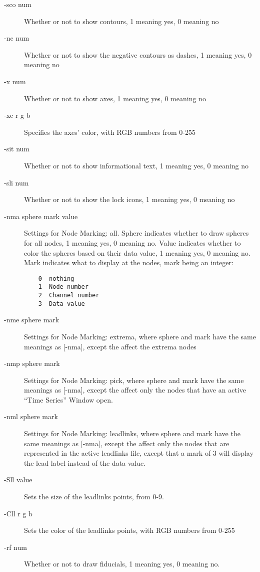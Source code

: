 \begin{description}
  \item[{-sco num}] Whether or not to show contours, 1 meaning yes, 0 meaning no
  \item[{-nc num}] Whether or not to show the negative contours as dashes, 1 meaning yes, 0 meaning no
  \item[{-x num}] Whether or not to show axes, 1 meaning yes, 0 meaning no
  \item[{-xc r g b}] Specifies the axes' color, with RGB numbers from 0-255
  \item[{-sit num}] Whether or not to show informational text, 1 meaning yes, 0 meaning no
  \item[{-sli num}] Whether or not to show the lock icons, 1 meaning yes, 0 meaning no
  \item[{-nma sphere mark value}] Settings for Node Marking: all.  
    Sphere indicates whether to draw spheres for all nodes, 1 meaning yes, 0 meaning no.
    Value indicates whether to color the spheres based on their data value, 1 meaning yes, 0 meaning no.
    Mark indicates what to display at the nodes, mark being an integer:
    \begin{verbatim}
    0  nothing
    1  Node number
    2  Channel number
    3  Data value
    \end{verbatim}
  \item[{-nme sphere mark}] Settings for Node Marking: extrema, where sphere and mark 
  have the same meanings as [{-nma}], except the affect the extrema nodes
  \item[{-nmp sphere mark}] Settings for Node Marking: pick, where sphere and mark 
  have the same meanings as [{-nma}], except the affect only the nodes that have an active ``Time Series''
  Window open.
  \item[{-nml sphere mark}] Settings for Node Marking: leadlinks, where sphere and mark 
  have the same meanings as [{-nma}], except the affect only the nodes that are
  represented in the active leadlinks file, except that a mark of 3 will display the lead label
  instead of the data value.
  \item[{-Sll value}] Sets the size of the leadlinks points, from 0-9.
  \item[{-Cll r g b}] Sets the color of the leadlinks points, with RGB numbers from 0-255
  \item[{-rf num}] Whether or not to draw fiducials, 1 meaning yes, 0 meaning no.  
  
  
\end{description}




